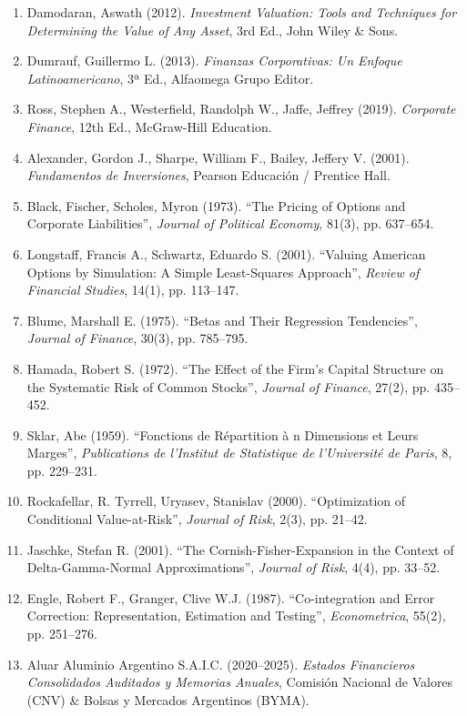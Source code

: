 \documentclass[10pt,a4paper]{article}
\begin{document}
\begin{enumerate}
    \small
    \item Damodaran, Aswath (2012). \textit{Investment Valuation: Tools and Techniques for Determining the Value of Any Asset}, 3rd Ed., John Wiley \& Sons.
    \item Dumrauf, Guillermo L. (2013). \textit{Finanzas Corporativas: Un Enfoque Latinoamericano}, 3ª Ed., Alfaomega Grupo Editor.
    \item Ross, Stephen A., Westerfield, Randolph W., Jaffe, Jeffrey (2019). \textit{Corporate Finance}, 12th Ed., McGraw-Hill Education.
    \item Alexander, Gordon J., Sharpe, William F., Bailey, Jeffery V. (2001). \textit{Fundamentos de Inversiones}, Pearson Educación / Prentice Hall.
    \item Black, Fischer, Scholes, Myron (1973). ``The Pricing of Options and Corporate Liabilities'', \textit{Journal of Political Economy}, 81(3), pp. 637--654.
    \item Longstaff, Francis A., Schwartz, Eduardo S. (2001). ``Valuing American Options by Simulation: A Simple Least-Squares Approach'', \textit{Review of Financial Studies}, 14(1), pp. 113--147.
    \item Blume, Marshall E. (1975). ``Betas and Their Regression Tendencies'', \textit{Journal of Finance}, 30(3), pp. 785--795.
    \item Hamada, Robert S. (1972). ``The Effect of the Firm's Capital Structure on the Systematic Risk of Common Stocks'', \textit{Journal of Finance}, 27(2), pp. 435--452.
    \item Sklar, Abe (1959). ``Fonctions de Répartition à n Dimensions et Leurs Marges'', \textit{Publications de l'Institut de Statistique de l'Université de Paris}, 8, pp. 229--231.
    \item Rockafellar, R. Tyrrell, Uryasev, Stanislav (2000). ``Optimization of Conditional Value-at-Risk'', \textit{Journal of Risk}, 2(3), pp. 21--42.
    \item Jaschke, Stefan R. (2001). ``The Cornish-Fisher-Expansion in the Context of Delta-Gamma-Normal Approximations'', \textit{Journal of Risk}, 4(4), pp. 33--52.
    \item Engle, Robert F., Granger, Clive W.J. (1987). ``Co-integration and Error Correction: Representation, Estimation and Testing'', \textit{Econometrica}, 55(2), pp. 251--276.
    \item Aluar Aluminio Argentino S.A.I.C. (2020–2025). \textit{Estados Financieros Consolidados Auditados y Memorias Anuales}, Comisión Nacional de Valores (CNV) \& Bolsas y Mercados Argentinos (BYMA).
\end{enumerate}
\end{document}
